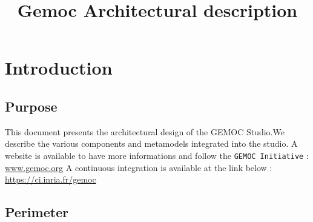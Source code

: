 \documentclass{gemoc} %
\title{Gemoc Architectural description}
\begin{document}
\maketitle

\begin{revisions}
	\begin{revtable}
	\end{revtable}
	\begin{revisionlabels}
	\end{revisionlabels}
\end{revisions}

\begin{tableofauthors}
\end{tableofauthors}

\tableofcontents
\newpage

\chapter{Introduction}


\section{Purpose}
This document presents the architectural design of the GEMOC Studio.\newline We describe the various components and metamodels integrated into the studio.
\newline A website is available to have more informations and follow the \texttt{GEMOC Initiative} : \url{www.gemoc.org}
\newline A continuous integration is available at the link below : \newline\url{https://ci.inria.fr/gemoc}

\section{Perimeter}
\end{document}
